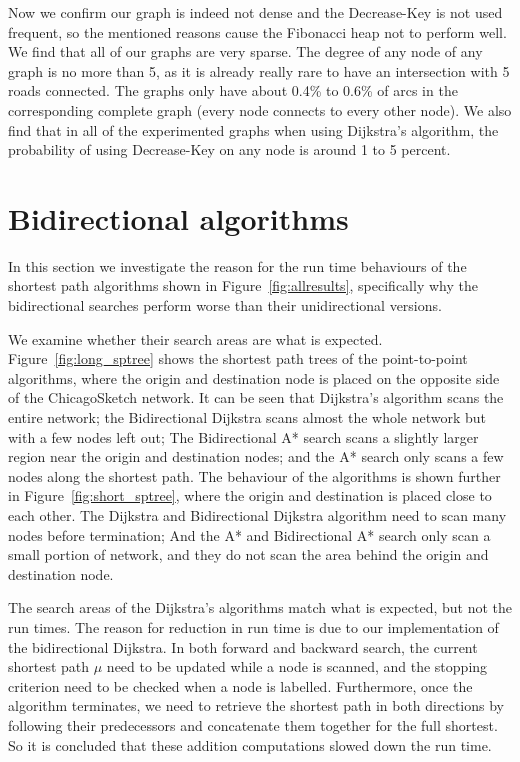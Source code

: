 Now we confirm our graph is indeed not dense and the Decrease-Key is not used frequent,
so the mentioned reasons cause the Fibonacci heap not to perform well.
We find that all of our graphs are very sparse.
The degree of any node of any graph is no more than 5,
as it is already really rare to have an intersection with 5 roads connected.
The graphs only have about 0.4\% to 0.6\% of arcs in the corresponding complete graph (every node connects to every other node).
We also find that in all of the experimented graphs when using Dijkstra's algorithm,
the probability of using Decrease-Key on any node is around 1 to 5 percent.

\section{Bidirectional algorithms}
In this section we investigate the reason for the run time behaviours of the shortest path algorithms shown in Figure~\ref{fig:allresults},
specifically why the bidirectional searches perform worse than their unidirectional versions.

We examine whether their search areas are what is expected.
Figure~\ref{fig:long_sptree} shows the shortest path trees of the point-to-point algorithms, where the origin and destination node is placed on the opposite side of the ChicagoSketch network.
It can be seen that Dijkstra's algorithm scans the entire network;
the Bidirectional Dijkstra scans almost the whole network but with a few nodes left out;
The Bidirectional A* search scans a slightly larger region near the origin and destination nodes;
and the A* search only scans a few nodes along the shortest path.
The behaviour of the algorithms is shown further in Figure~\ref{fig:short_sptree},
where the origin and destination is placed close to each other.
The Dijkstra and Bidirectional Dijkstra algorithm need to scan many nodes before termination;
And the A* and Bidirectional A* search only scan a small portion of network,
and they do not scan the area behind the origin and destination node.

The search areas of the Dijkstra's algorithms match what is expected,
but not the run times.
The reason for reduction in run time is due to our implementation of the bidirectional Dijkstra.
In both forward and backward search,
the current shortest path $\mu$ need to be updated
while a node is scanned,
and the stopping criterion need to be checked when a node is labelled.
Furthermore,
once the algorithm terminates,
we need to retrieve the shortest path in both directions by following their predecessors and concatenate them together for the full shortest.
So it is concluded that these addition computations slowed down the run time.

